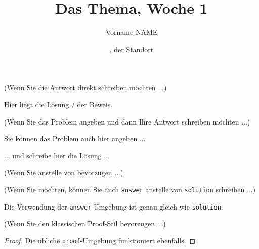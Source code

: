 \documentclass[11pt,
  logo = {example-image},
  title in boldface,
  theorem in new line,
]{homework}
\title{Das Thema, Woche 1}
\author{Vorname NAME}
\date{\TheDate{2023-12-25}, der Standort}
\begin{document}
\bigskip\textcolor{gray!55}{(Wenn Sie die Antwort direkt schreiben möchten ...)}

\begin{problem}
    Hier liegt die Lösung / der Beweis.
\end{problem}


\bigskip\textcolor{gray!55}{(Wenn Sie das Problem angeben und dann Ihre Antwort schreiben möchten ...)}

\begin{problem}
    Sie können das Problem auch hier angeben ...
\end{problem}

\begin{solution}
    ... und schreibe hier die Lösung ...
\end{solution}

\bigskip\textcolor{gray!55}{(Wenn Sie  anstelle von  bevorzugen ...)}



\bigskip\textcolor{gray!55}{(Wenn Sie möchten, können Sie auch \texttt{answer} anstelle von \texttt{solution} schreiben ...)}

\begin{answer}
    Die Verwendung der \verb|answer|-Umgebung ist genau gleich wie \verb|solution|.
\end{answer}


\bigskip\textcolor{gray!55}{(Wenn Sie den klassischen Proof-Stil bevorzugen ...)}

\begin{proof}
    Die übliche \verb|proof|-Umgebung funktioniert ebenfalls.
\end{proof}


\end{document}
